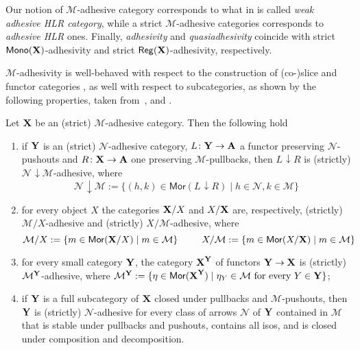 \documentclass[3p]{elsarticle}
\def\X{\textbf {\textup{X}}}
\def\Y{\textbf {\textup{Y}}}
\def\A{\textbf {\textup{A}}}
\renewcommand{\comma}[2]{#1\hspace{1pt} {\downarrow}#2}
\newcommand{\mor}{\mathsf{Mor}}
\newcommand{\mon}{\mathsf{Mono}}
\newcommand{\reg}{\mathsf{Reg}}
\theoremstyle{remark}
\theoremstyle{definition}
\begin{document}
\begin{rem}
	\label{rem:salva} Our notion of $\mathcal{M}$-adhesive category corresponds to what in \cite{ehrig2006fundamentals} is called \emph{weak adhesive HLR category}, while a strict $\mathcal{M}$-adhesive categories corresponds to \emph{adhesive HLR} ones. Finally, 	\emph{adhesivity} and \emph{quasiadhesivity} 
	\cite{lack2005adhesive,garner2012axioms} coincide with strict
	$\mon(\X) $-adhesivity and strict $\reg(\X)$-adhesivity,
	respectively. %
\end{rem}


$\mathcal{M}$-adhesivity is well-behaved with respect to  the construction of (co-)slice and functor categories \cite{mac2013categories}, as well with respect to subcategories, as shown by the following properties, taken from~\cite[Thm.~4.15]{ehrig2006fundamentals}, \cite[Prop.~3.5]{lack2005adhesive} and  \cite[Thm.~2.12]{CastelnovoGM24}.

\begin{thm}
	\label{thm:slice-functors}
	Let $\X$ be an (strict) $\mathcal{M}$-adhesive category. Then the following hold
	\begin{enumerate}
		\item if $\Y$ is an (strict) $\mathcal{N}$-adhesive category, $L\colon \Y\to \A$ a functor preserving $\mathcal{N}$-pushouts and $R\colon \X\to \A$ one preserving $\mathcal{M}$-pullbacks, then $\comma{L}{R}$ is (strictly) $\comma{\mathcal{N}}{\mathcal{M}}$-adhesive, where
		\[\comma{\mathcal{N}}{\mathcal{M}}:=\{(h,k) \in \mor(\comma{L}{R}) \mid h\in \mathcal{N}, k\in \mathcal{M}\}\]
		\item for every object $X$
		the categories $\X/X$  and $X/\X$ are, respectively, (strictly) $\mathcal{M}/X$-adhesive and (strictly) $X/\mathcal{M}$-adhesive, where
		\[\mathcal{M}/X:=\{m\in \mor(\X/X) \mid m\in
		\mathcal{M}\} \hspace{25pt} X/\mathcal{M}:=\{m\in \mor(X/\X) \mid m\in \mathcal{M}\}\]
		\item for every small category $\Y$, the category $\X^\Y$ of
		functors $\Y\to \X$ is (strictly) $\mathcal{M}^{\Y}$-adhesive, where
		$\mathcal{M}^{\Y}:=\{\eta \in \mor(\X^\Y) \mid \eta_Y \in
		\mathcal{M} \text{ for every } Y\in \Y\}$;
		\item if $\Y$ is a full subcategory of $\X$ closed under pullbacks and $\mathcal{M}$-pushouts, then $\Y$ is (strictly) $\mathcal{N}$-adhesive for every class of arrows $\mathcal{N}$ of $\Y$ contained in $\mathcal{M}$ that is stable under pullbacks and pushouts, contains all isos, and is closed under composition and decomposition.
	\end{enumerate} 
\end{thm}
\end{document}
